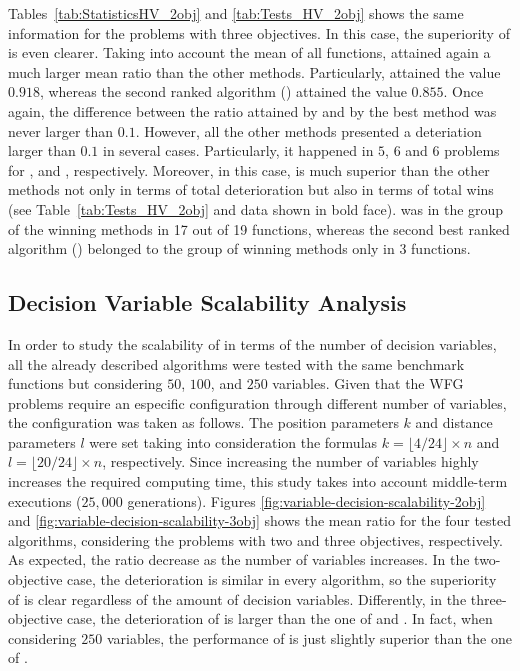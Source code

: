 Tables~\ref{tab:StatisticsHV_2obj} and \ref{tab:Tests_HV_2obj} shows the same information for the problems with three objectives.
%
In this case, the superiority of \VSDMOEA{} is even clearer.
%
Taking into account the mean of all functions, \VSDMOEA{} attained again a much larger mean \HV{} ratio than the other methods.
%
Particularly, \VSDMOEA{} attained the value $0.918$, whereas the second ranked algorithm (\RMOEA{}) attained the value $0.855$.
%
Once again, the difference between the \HV{} ratio attained by \VSDMOEA{} and by the best method was never larger
than $0.1$.
%
However, all the other methods presented a deteriation larger than $0.1$ in several cases.
%
Particularly, it happened in $5$, $6$ and $6$ problems for \RMOEA{}, \NSGAII{} and \MOEAD{}, respectively.
%
Moreover, in this case, \VSDMOEA{} is much superior than the other methods not only in terms of total deterioration but also
in terms of total wins (see Table~\ref{tab:Tests_HV_2obj} and data shown in bold face).
%
\VSDMOEA{} was in the group of the winning methods in 17 out of 19 functions, whereas the second best ranked algorithm (\RMOEA{})
belonged to the group of winning methods only in 3 functions.

\subsection{Decision Variable Scalability Analysis}

In order to study the scalability of \VSDMOEA{} in terms of the number of decision variables, all the already described algorithms were tested with
the same benchmark functions but considering $50$, $100$, and $250$ variables.
%
Given that the WFG problems require an especific configuration through different number of variables, the configuration was taken as follows.
%
The position parameters $k$ and distance parameters $l$ were set taking into consideration the formulas $k=\lfloor4/24 \rfloor \times n$ and $l=\lfloor 20/24 \rfloor \times n$, respectively.
%
Since increasing the number of variables highly increases the required computing time, this study takes into account middle-term executions ($25,000$ generations).
%
Figures \ref{fig:variable-decision-scalability-2obj} and \ref{fig:variable-decision-scalability-3obj} shows the mean \HV{} ratio for the four tested algorithms,
considering the problems with two and three objectives, respectively.
%
As expected, the \HV{} ratio decrease as the number of variables increases.
%
In the two-objective case, the deterioration is similar in every algorithm, so the superiority of \VSDMOEA{} is clear regardless of the amount of decision
variables.
%
Differently, in the three-objective case, the deterioration of \VSDMOEA{} is larger than the one of \RMOEA{} and \MOEAD{}.
%
In fact, when considering $250$ variables, the performance of \VSDMOEA{} is just slightly superior than the one of \RMOEA{}.


